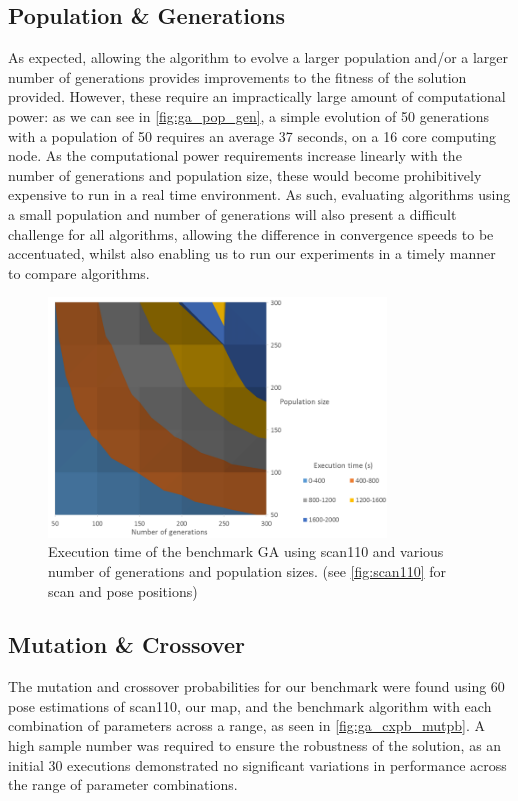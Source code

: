 \documentclass[authoryearcitations]{UoYCSproject}
\begin{document}
\subsection{Population \& Generations}
As expected, allowing the algorithm to evolve a larger population and/or a larger number of generations provides improvements to the fitness of the solution provided. However, these require an impractically large amount of computational power: as we can see in \autoref{fig:ga_pop_gen}, a simple evolution of 50 generations with a population of 50 requires an average 37 seconds, on a 16 core computing node. As the computational power requirements increase linearly with the number of generations and population size, these would become prohibitively expensive to run in a real time environment. As such, evaluating algorithms using a small population and number of generations will also present a difficult challenge for all algorithms, allowing the difference in convergence speeds to be accentuated, whilst also enabling us to run our experiments in a timely manner to compare algorithms.
\begin{figure}[ht]
\centering
	\includegraphics[width=0.8\textwidth,keepaspectratio]{images/ga_pop_gen_sweep.png}
	\caption{Execution time of the benchmark GA using scan110 and various number of generations and population sizes. (see \autoref{fig:scan110} for scan and pose positions)}
	\label{fig:ga_pop_gen}
\end{figure}

\subsection{Mutation \& Crossover}
\label{subsec:benchmark_mutpb_cxpb}
The mutation and crossover probabilities for our benchmark were found using 60 pose estimations of scan110, our map, and the benchmark algorithm with each combination of parameters across a range, as seen in \autoref{fig:ga_cxpb_mutpb}. A high sample number was required to ensure the robustness of the solution, as an initial 30 executions demonstrated no significant variations in performance across the range of parameter combinations. \newline
\end{document}
